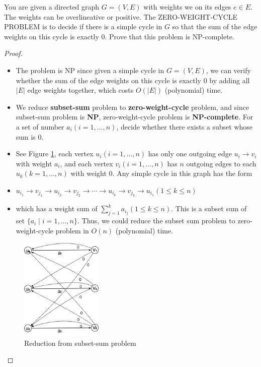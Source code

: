 \documentclass{article}
\newcounter{exercise}
\newcommand{\<}{
    \langle}
\renewcommand{\>}{
    \rangle}
\begin{document}
{\begin{exercise}
You are given a directed graph $G=(V,E)$ with weights we on its edges $e\in E$. The weights can be overlineative or positive. The \textsf{ZERO-WEIGHT-CYCLE PROBLEM} is to decide if there is a simple cycle in $G$ so that the sum of the edge weights on this cycle is exactly $0$. Prove that this problem is NP-complete.
\end{exercise}
\begin{proof}
    \leavevmode\newline
    \begin{itemize}
        \item The problem is NP since given a simple cycle in $G=(V,E)$, we can verify whether the sum of the edge weights on this cycle is exactly $0$ by adding all $|E|$ edge weights together, which costs $O(|E|)$ (polynomial) time.
        \item We reduce \textbf{subset-sum} problem to \textbf{zero-weight-cycle} problem, and since {subset-sum} problem is \textbf{NP}, zero-weight-cycle problem is \textbf{NP-complete}. For a set of number $a_i(i=1,\ldots ,n)$, decide whether there exists a subset whose sum is $0$.
        \item See Figure \ref{fig:ccc}, each vertex $u_i(i=1,\ldots ,n)$ has only one outgoing edge $u_i\rightarrow v_i$ with weight $a_i$, and each vertex $v_i(i=1,\ldots ,n)$ has $n$ outgoing edges to each $u_k(k=1,\ldots,n)$ with weight $0$. Any simple cycle in this graph has the form
        \item $u_{i_1}\rightarrow v_{j_1}\rightarrow u_{i_2}\rightarrow v_{j_2}\rightarrow \cdots \rightarrow u_{i_k}\rightarrow v_{j_k} \rightarrow u_{i_1}(1\leq k\leq n)$
        \item which has a weight sum of $\sum\limits_{j=1}^{k}a_{i_j}(1\leq k\leq n)$. This is a subset sum of set $\{a_i\mid i=1,\ldots ,n\}$. Thus, we could reduce the subset sum problem to zero-weight-cycle problem in $O(n)$ (polynomial) time.
    \end{itemize}
    \begin{figure}[!htp]
        \centering
        \includegraphics[width=0.35\textwidth]{img/4.jpg}
        \caption{Reduction from subset-sum problem}
        \label{fig:ccc}
      \end{figure}
\end{proof}
\newpage

}
\end{document}
